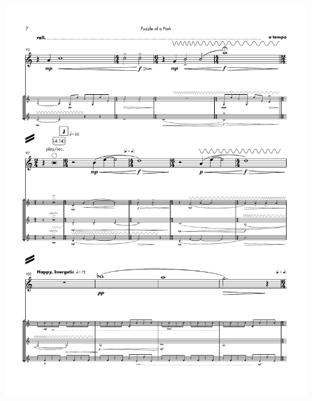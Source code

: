     \begin{center}
    \includegraphics[scale=0.75]{Scores/puzzlePart12.pdf}
    \end{center}
    \newpage
